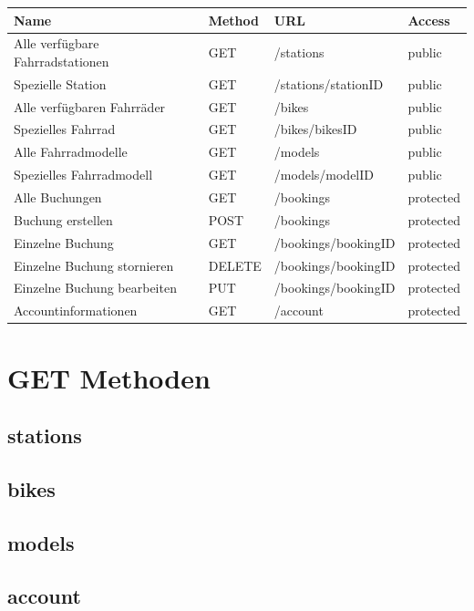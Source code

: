 \begin{tabularx}{\columnwidth}{|X|p{1.5cm}|X|p{1.5cm}|}
	\hline
	Name & Method & URL & Access \\
	\hline
	\hline
	Alle verfügbare Fahrradstationen & GET & /stations & public \\
	\hline
	Spezielle Station & GET & /stations/stationID & public \\
	\hline
	Alle verfügbaren Fahrräder & GET & /bikes & public \\
	\hline
	Spezielles Fahrrad & GET & /bikes/bikesID & public \\
	\hline
	Alle Fahrradmodelle & GET & /models & public \\
	\hline
	Spezielles Fahrradmodell & GET & /models/modelID & public \\
	\hline
	Alle Buchungen & GET & /bookings & protected \\
	\hline
	Buchung erstellen & POST & /bookings & protected \\
	\hline
	Einzelne Buchung & GET & /bookings/bookingID & protected \\
	\hline
	Einzelne Buchung stornieren & DELETE & /bookings/bookingID & protected \\
	\hline
	Einzelne Buchung bearbeiten & PUT & /bookings/bookingID & protected \\
	\hline
	Accountinformationen & GET & /account & protected \\
	\hline
\end{tabularx}

\section{GET Methoden}
\subsection{stations}

\subsection{bikes}

\subsection{models}

\subsection{account}

